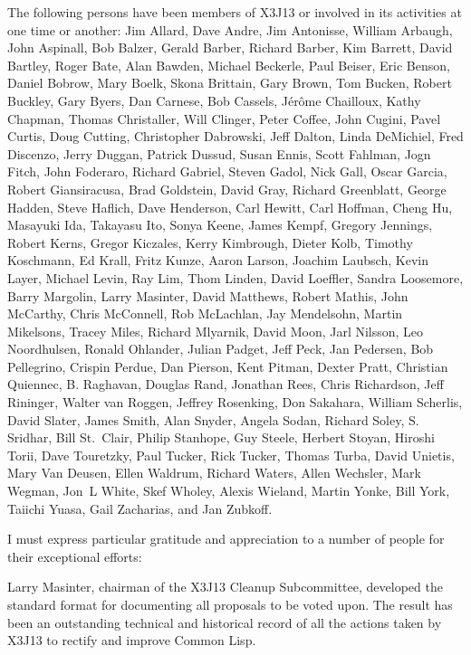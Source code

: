 The following persons have been members of X3J13 or involved in its
activities at one time or another:
Jim Allard, Dave Andre, Jim Antonisse, William Arbaugh, John
Aspinall, Bob Balzer, Gerald Barber, Richard Barber, Kim Barrett,
David Bartley, Roger Bate, Alan Bawden, Michael Beckerle, Paul
Beiser, Eric Benson, Daniel Bobrow, Mary Boelk, Skona Brittain, Gary
Brown, Tom Bucken, Robert Buckley, Gary Byers, Dan Carnese, Bob
Cassels, J\'er\^ome Chailloux, Kathy Chapman, Thomas Christaller,
Will Clinger, Peter Coffee, John Cugini, Pavel Curtis, Doug Cutting,
Christopher Dabrowski, Jeff Dalton, Linda DeMichiel, Fred Discenzo,
Jerry Duggan, Patrick Dussud, Susan Ennis, Scott Fahlman, Jogn Fitch,
John Foderaro, Richard Gabriel, Steven Gadol, Nick Gall, Oscar
Garcia, Robert Gian\-sira\-cusa, Brad Goldstein, David Gray, Richard
Greenblatt, George Hadden, Steve Haflich, Dave Henderson, Carl
Hewitt, Carl Hoffman, Cheng Hu, Masayuki Ida, Takayasu Ito, Sonya
Keene, James Kempf, Gregory Jennings, Robert Kerns, Gregor Kiczales,
Kerry Kimbrough, Dieter Kolb, Timothy Koschmann, Ed Krall, Fritz
Kunze, Aaron Larson, Joachim Laubsch, Kevin Layer, Michael Levin, Ray
Lim, Thom Linden, David Loeffler, Sandra Loosemore, Barry Margolin,
Larry Masinter, David Matthews, Robert Mathis, John McCarthy, Chris
McConnell, Rob McLachlan, Jay Mendelsohn, Martin Mikelsons, Tracey
Miles, Richard Mlyarnik, David Moon, Jarl Nilsson, Leo Noordhulsen,
Ronald Ohlander, Julian Padget, Jeff Peck, Jan Pedersen, Bob
Pellegrino, Crispin Perdue, Dan Pierson, Kent Pitman, Dexter Pratt,
Christian Quiennec, B. Raghavan, Douglas Rand, Jonathan Rees, Chris
Richardson, Jeff Rininger, Walter van Roggen, Jeffrey Rosenking,  Don
Sakahara, William Scherlis, David Slater, James Smith, Alan Snyder,
Angela Sodan, Richard Soley, S. Sridhar, Bill St.\ Clair, Philip
Stanhope, Guy Steele, Herbert Stoyan, Hiroshi Torii, Dave Touretzky,
Paul Tucker, Rick Tucker, Thomas Turba, David Unietis, Mary Van
Deusen, Ellen Waldrum, Richard Waters, Allen Wechsler, Mark Wegman,
Jon~L White, Skef Wholey, Alexis Wieland, Martin Yonke, Bill York,
Taiichi Yuasa, Gail Zacharias, and Jan Zubkoff.





I must express particular gratitude and appreciation to a number
of people for their exceptional efforts:

Larry Masinter, chairman of
the X3J13 Cleanup Subcommittee, developed the standard format for
documenting all proposals to be voted upon.  The result has been
an outstanding technical and historical record of all the actions
taken by X3J13 to rectify and improve Common Lisp.


